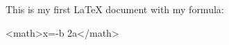 \documentclass[11]{article}
\begin{document}
This is my first LaTeX document with my formula:

<math>x={-b\pm{} \over 2a}</math>
\end{document}
